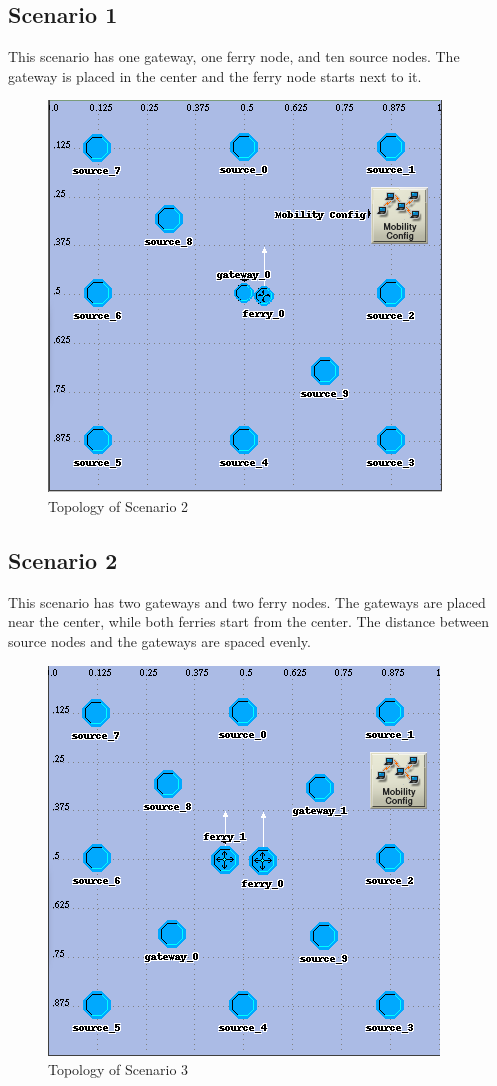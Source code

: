 \subsection{Scenario 1}		%
This scenario has one gateway, one ferry node, and ten source nodes.
The gateway is placed in the center and the ferry node starts next to it.
\begin{figure}[ht]
    \centering
    \includegraphics[width=.5\textwidth]{images/scenario2-top}
    \caption{Topology of Scenario 2}
    \label{fig:scenario2}
\end{figure}


\subsection{Scenario 2}		%
This scenario has two gateways and two ferry nodes. 
The gateways are placed near the center, while both ferries start from the center.
The distance between source nodes and the gateways are spaced evenly.
\begin{figure}[ht]
    \centering
    \includegraphics[width=.5\textwidth]{images/scenario3-top}
    \caption{Topology of Scenario 3}
    \label{fig:scenario3}
\end{figure}


